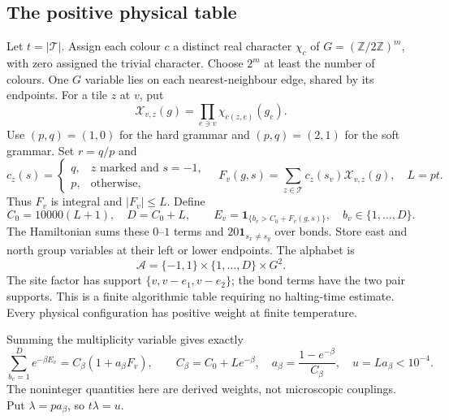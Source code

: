\documentclass[11pt,reqno]{amsart}
\numberwithin{equation}{section}
\theoremstyle{definition}
\theoremstyle{remark}
\newcommand{\Z}{\mathbb Z}
\newcommand{\one}{\mathbf1}
\newcommand{\cT}{\mathcal T}
\begin{document}
\subsection{The positive physical table}
Let $t=|\cT|$. Assign each colour $c$ a distinct real character $\chi_c$ of $G=(\Z/2\Z)^m$, with zero assigned the trivial character. Choose $2^m$ at least the number of colours. One $G$ variable lies on each nearest-neighbour edge, shared by its endpoints. For a tile $z$ at $v$, put
\[
 \mathcal X_{v,z}(g)=\prod_{e\ni v}\chi_{c(z,e)}(g_e).
\]
Use $(p,q)=(1,0)$ for the hard grammar and $(p,q)=(2,1)$ for the soft grammar. Set $r=q/p$ and
\[
 c_z(s)=\begin{cases}q,&z\text{ marked and }s=-1,\\p,&\text{otherwise},\end{cases}
 \quad F_v(g,s)=\sum_{z\in\cT}c_z(s_v)\mathcal X_{v,z}(g),\quad L=pt.
\]
Thus $F_v$ is integral and $|F_v|\leq L$. Define
\begin{equation}\label{eq:integer-table}
 C_0=10000(L+1),\quad D=C_0+L,\qquad
 E_v=\one_{\{b_v>C_0+F_v(g,s)\}},\quad b_v\in\{1,\ldots,D\}.
\end{equation}
The Hamiltonian sums these $0$--$1$ terms and $20\one_{s_x\ne s_y}$ over bonds. Store east and north group variables at their left or lower endpoints. The alphabet is
\begin{equation}\label{eq:alphabet}
 \mathcal A=\{-1,1\}\times\{1,\ldots,D\}\times G^2.
\end{equation}
The site factor has support $\{v,v-e_1,v-e_2\}$; the bond terms have the two pair supports. This is a finite algorithmic table requiring no halting-time estimate. Every physical configuration has positive weight at finite temperature.

Summing the multiplicity variable gives exactly
\begin{equation}\label{eq:multiplicity}
 \sum_{b_v=1}^D e^{-\beta E_v}
 =C_\beta(1+a_\beta F_v),\qquad
 C_\beta=C_0+Le^{-\beta},\quad
 a_\beta=\frac{1-e^{-\beta}}{C_\beta},\quad u=La_\beta<10^{-4}.
\end{equation}
The noninteger quantities here are derived weights, not microscopic couplings. Put $\lambda=pa_\beta$, so $t\lambda=u$.
\end{document}
